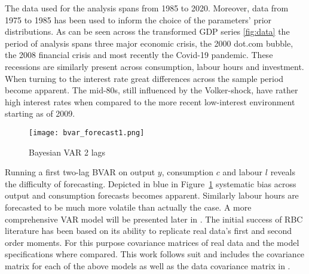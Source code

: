 \documentclass[12pt,a4paper,english]{article} %
\begin{document}
	The data used for the analysis spans from 1985 to 2020. Moreover, data from 1975 to 1985 has been used to inform the choice of the parameters' prior distributions. 
	As can be seen across the transformed GDP series \ref{fig:data} the period of analysis spans three major economic crisis, the 2000 dot.com bubble, the 2008 financial crisis and most recently the Covid-19 pandemic. These recessions are similarly present across consumption, labour hours and investment. When turning to the interest rate great differences across the sample period become apparent. The mid-80s, still influenced by the Volker-shock, have rather high interest rates when compared to the more recent low-interest environment starting as of 2009.
	\begin{figure}[H]
		\begin{center}
			\texttt{[image: bvar\_forecast1.png]}
			\caption{Bayesian VAR 2 lags}
			\label{fig:bvar_2lags}
		\end{center}
	\end{figure}
	Running a first two-lag \ac{BVAR} on output $y$, consumption $c$ and labour $l$ reveals the difficulty of forecasting. Depicted in blue in Figure~\ref{fig:bvar_2lags} systematic bias across output and consumption forecasts becomes apparent. Similarly labour hours are forecasted to be much more volatile than actually the case. A more comprehensive \ac{VAR} model will be presented later in .
	The initial success of RBC literature has been based on its ability to replicate real data's first and second order moments.
	For this purpose covariance matrices of real data and the model specifications where compared. This work follows suit and includes the covariance matrix for each of the above models as well as the data covariance matrix in .
			
\end{document}

